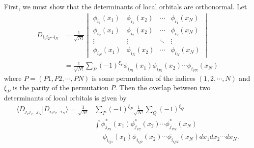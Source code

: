 \documentclass[a4paper, 11pt]{revtex4}
\newcommand{\bra}{\langle}
\newcommand{\ket}{\rangle}
\begin{document}
First, we must show that the determinants of local orbitals are orthonormal.  Let
\begin{align}
D_{i_1i_2\cdots i_N} &= \frac{1}{\sqrt{N!}}
\begin{vmatrix}
\phi_{i_1}(x_1) & \phi_{i_1}(x_2) & \cdots & \phi_{i_1}(x_N) \\
\phi_{i_2}(x_1) & \phi_{i_2}(x_2) & \cdots & \phi_{i_2}(x_N) \\
\vdots      & \vdots      & \ddots & \vdots      \\
\phi_{i_N}(x_1) & \phi_{i_N}(x_2) & \cdots & \phi_{i_N}(x_N)
\end{vmatrix} \\
&= \frac{1}{\sqrt{N!}} \sum_P (-1)^{\xi_P} \phi_{i_{P1}}(x_1) \phi_{i_{P2}}(x_2) \cdots \phi_{i_{PN}}(x_N)
\end{align}
where $P=(P1,P2,\cdots,PN)$ is some permutation of the indices $(1,2,\cdots,N)$ and $\xi_P$ is the parity of the permutation $P$.  Then the overlap between two determinants of local orbitals is given by
\begin{equation}
\begin{split}
\bra D_{j_1j_2\cdots j_N} | D_{i_1i_2\cdots i_N} \ket = 
\frac{1}{\sqrt{N!}}& \sum_P (-1)^{\xi_P}
\frac{1}{\sqrt{N!}} \sum_Q (-1)^{\xi_Q} \\
&\int
\phi_{j_{P1}}^*(x_1) \phi_{j_{P2}}^*(x_2) \cdots \phi_{j_{PN}}^*(x_N) \\
&\quad\ \phi_{i_{Q1}}(x_1) \phi_{i_{Q2}}(x_2) \cdots \phi_{i_{QN}}(x_N)
dx_1 dx_2 \cdots dx_N.
\end{split}
\end{equation}
\end{document}
